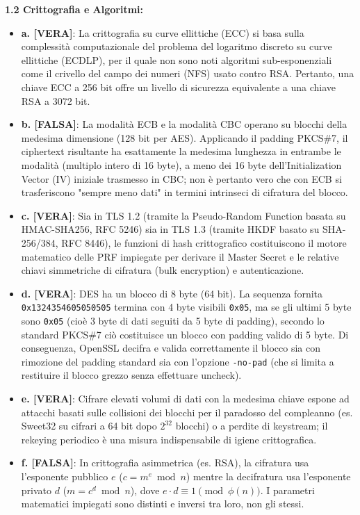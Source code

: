 \documentclass[11pt,a4paper]{article}
\begin{document}
\begin{solutionbox}
\textbf{1.2 Crittografia e Algoritmi:}
\begin{itemize}
    \item \textbf{a. [VERA]}: La crittografia su curve ellittiche (ECC) si basa sulla complessità computazionale del problema del logaritmo discreto su curve ellittiche (ECDLP), per il quale non sono noti algoritmi sub-esponenziali come il crivello del campo dei numeri (NFS) usato contro RSA. Pertanto, una chiave ECC a 256 bit offre un livello di sicurezza equivalente a una chiave RSA a 3072 bit.
    \item \textbf{b. [FALSA]}: La modalità ECB e la modalità CBC operano su blocchi della medesima dimensione (128 bit per AES). Applicando il padding PKCS\#7, il ciphertext risultante ha esattamente la medesima lunghezza in entrambe le modalità (multiplo intero di 16 byte), a meno dei 16 byte dell'Initialization Vector (IV) iniziale trasmesso in CBC; non è pertanto vero che con ECB si trasferiscono "sempre meno dati" in termini intrinseci di cifratura del blocco.
    \item \textbf{c. [VERA]}: Sia in TLS 1.2 (tramite la Pseudo-Random Function basata su HMAC-SHA256, RFC 5246) sia in TLS 1.3 (tramite HKDF basato su SHA-256/384, RFC 8446), le funzioni di hash crittografico costituiscono il motore matematico delle PRF impiegate per derivare il Master Secret e le relative chiavi simmetriche di cifratura (bulk encryption) e autenticazione.
    \item \textbf{d. [VERA]}: DES ha un blocco di 8 byte (64 bit). La sequenza fornita \texttt{0x1324354605050505} termina con 4 byte visibili \texttt{0x05}, ma se gli ultimi 5 byte sono \texttt{0x05} (cioè 3 byte di dati seguiti da 5 byte di padding), secondo lo standard PKCS\#7 ciò costituisce un blocco con padding valido di 5 byte. Di conseguenza, OpenSSL decifra e valida correttamente il blocco sia con rimozione del padding standard sia con l'opzione \texttt{-no-pad} (che si limita a restituire il blocco grezzo senza effettuare uncheck).
    \item \textbf{e. [VERA]}: Cifrare elevati volumi di dati con la medesima chiave espone ad attacchi basati sulle collisioni dei blocchi per il paradosso del compleanno (es. Sweet32 su cifrari a 64 bit dopo $2^{32}$ blocchi) o a perdite di keystream; il rekeying periodico è una misura indispensabile di igiene crittografica.
    \item \textbf{f. [FALSA]}: In crittografia asimmetrica (es. RSA), la cifratura usa l'esponente pubblico $e$ ($c = m^e \bmod n$) mentre la decifratura usa l'esponente privato $d$ ($m = c^d \bmod n$), dove $e \cdot d \equiv 1 \pmod{\phi(n)}$. I parametri matematici impiegati sono distinti e inversi tra loro, non gli stessi.

\end{itemize}
\end{solutionbox}
\end{document}
